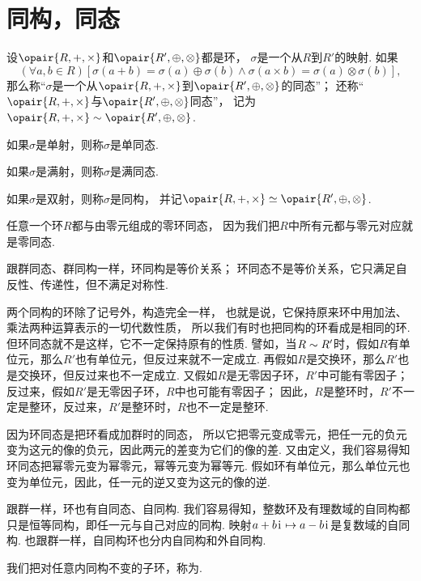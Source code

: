 \section{同构，同态}
\begin{definition}
设\(\opair{R,+,\times}\)和\(\opair{R',\oplus,\otimes}\)都是环，
\(\sigma\)是一个从\(R\)到\(R'\)的映射.
如果\begin{equation*}
	(\forall a,b\in R)[
		\sigma(a+b)=\sigma(a)\oplus\sigma(b)
		\land
		\sigma(a \times b)=\sigma(a)\otimes\sigma(b)
	],
\end{equation*}
那么称“\(\sigma\)是一个从\(\opair{R,+,\times}\)到\(\opair{R',\oplus,\otimes}\)的同态”；
还称“\(\opair{R,+,\times}\)与\(\opair{R',\oplus,\otimes}\)同态”，
记为\(\opair{R,+,\times} \Homomorphism \opair{R',\oplus,\otimes}\).

如果\(\sigma\)是单射，则称\(\sigma\)是单同态.

如果\(\sigma\)是满射，则称\(\sigma\)是满同态.

如果\(\sigma\)是双射，则称\(\sigma\)是同构，
并记\(\opair{R,+,\times} \Isomorphism \opair{R',\oplus,\otimes}\).
\end{definition}

任意一个环\(R\)都与由零元组成的零环同态，
因为我们把\(R\)中所有元都与零元对应就是零同态.

跟群同态、群同构一样，环同构是等价关系；
环同态不是等价关系，它只满足自反性、传递性，但不满足对称性.

两个同构的环除了记号外，构造完全一样，
也就是说，它保持原来环中用加法、乘法两种运算表示的一切代数性质，
所以我们有时也把同构的环看成是相同的环.
但环同态就不是这样，它不一定保持原有的性质.
譬如，当\(R \sim R'\)时，假如\(R\)有单位元，那么\(R'\)也有单位元，但反过来就不一定成立.
再假如\(R\)是交换环，那么\(R'\)也是交换环，但反过来也不一定成立.
又假如\(R\)是无零因子环，\(R'\)中可能有零因子；
反过来，假如\(R'\)是无零因子环，\(R\)中也可能有零因子；
因此，\(R\)是整环时，\(R'\)不一定是整环，反过来，\(R'\)是整环时，\(R\)也不一定是整环.

因为环同态是把环看成加群时的同态，
所以它把零元变成零元，把任一元的负元变为这元的像的负元，因此两元的差变为它们的像的差.
又由定义，我们容易得知环同态把幂零元变为幂零元，幂等元变为幂等元.
假如环有单位元，那么单位元也变为单位元，因此，任一元的逆又变为这元的像的逆.

跟群一样，环也有自同态、自同构.
我们容易得知，整数环及有理数域的自同构都只是恒等同构，即任一元与自己对应的同构.
映射\(a+b\kern1pt\mathrm{i}\kern1pt \mapsto a-b\kern1pt\mathrm{i}\kern1pt\)是复数域的自同构.
也跟群一样，自同构环也分内自同构和外自同构.

我们把对任意内同构不变的子环，称为.

